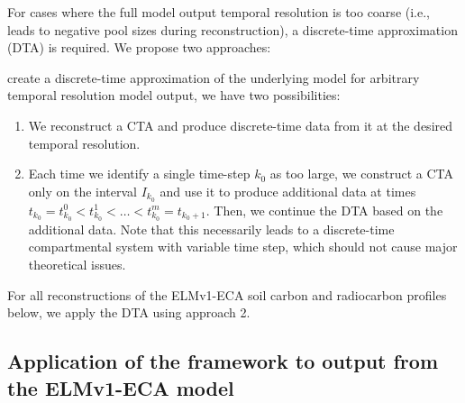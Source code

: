 \documentclass[11pt,a4paper]{article}
\begin{document}
    For cases where the full model output temporal resolution is too coarse (i.e., leads to negative pool sizes during reconstruction), a discrete-time approximation (DTA) is required. We propose two approaches:
    
    create a discrete-time approximation of the underlying model for arbitrary temporal resolution model output, we have two possibilities:
    
    \begin{enumerate}[(1)]
        \item We reconstruct a CTA and produce discrete-time data from it at the desired temporal resolution.
        \item Each time we identify a single time-step $k_0$ as too large, we construct a CTA only on the interval $I_{k_0}$ and use it to produce additional data at times $t_{k_0}=t_{k_0}^0<t_{k_0}^1<\ldots<t_{k_0}^m=t_{k_0+1}$.
        Then, we continue the DTA based on the additional data.
        Note that this necessarily leads to a discrete-time compartmental system with variable time step, which should not cause major theoretical issues.
    \end{enumerate}

For all reconstructions of the ELMv1-ECA soil carbon and radiocarbon profiles below, we apply the DTA using approach 2.

\subsection{Application of the framework to output from the ELMv1-ECA model}
    
\end{document}
